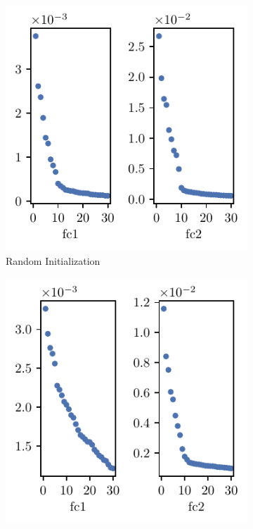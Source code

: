 \begin{figure}[th]
\begin{subfigure}[b]{0.32\textwidth}
        \includegraphics[width=\textwidth]{Figures/Eigenspectrum/UTAU/UTAU_sigval_d30_CIFAR10_Exp1_LeNet5_fixlr0.01R1_E0_fc1fc2.pdf}
        \caption{Random Initialization}
        \label{fig:UTAU_spec_init}
    \end{subfigure}\hfill
    \begin{subfigure}[b]{0.32\textwidth}
        \centering
        \captionsetup{justification=centering}
        \includegraphics[width=\textwidth]{Figures/Eigenspectrum/UTAU/UTAU_sigval_d30_CIFAR10_RandomLabel_LeNet5_fixlr0.01_RLR1_E-1_fc1fc2.pdf}

\end{subfigure}
\end{figure}
